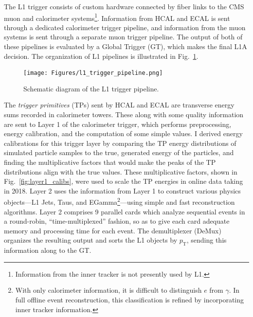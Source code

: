 The L1 trigger consists of custom hardware connected by fiber links to the CMS muon and calorimeter systems\footnote{Information
from the inner tracker is not presently used by L1.}. Information from HCAL and ECAL is
sent through a dedicated calorimeter trigger pipeline, and information from the muon systems is sent through a separate muon trigger pipeline.
The output of both of these pipelines is evaluated by a Global Trigger (GT), which makes
the final L1A decision. The organization of L1 pipelines is illustrated in Fig.~\ref{fig:l1_trigger_pipeline}.

\begin{figure}[hbtp]
  \begin{center}
    \texttt{[image: Figures/l1\_trigger\_pipeline.png]}
    \caption{
    Schematic diagram of the L1 trigger pipeline.
    }
    \label{fig:l1_trigger_pipeline}
  \end{center}
\end{figure}

The \textit{trigger primitives} (TPs) sent by HCAL and ECAL are transverse energy sums recorded in calorimeter towers.
These along with some quality information are sent to Layer 1 of the calorimeter trigger,
which performs preprocessing, energy calibration, and the computation of some simple values. I derived energy calibrations for this trigger layer
by comparing the TP energy distributions of simulated particle samples to the true, generated energy of the particles, and finding the
multiplicative factors that would make the peaks of the TP distributions align with the true values. These multiplicative factors, shown in Fig.~\ref{fig:layer1_calibs},
were used to scale the TP energies in online data taking in 2018. Layer 2 uses the information from Layer 1 to construct
various physics objects---L1 Jets, Taus, and EGamma\footnote{With only calorimeter information, it is difficult to distinguish $e$ from $\gamma$.
In full offline event reconstruction, this classification is refined by incorporating inner tracker information.}---using simple and fast reconstruction algorithms.
Layer 2 comprises 9 parallel cards which analyze sequential events in a round-robin, ``time-multiplexed'' fashion, so as to give
each card adequate memory and processing time for each event. The demultiplexer (DeMux) organizes the resulting output and sorts the L1 objects by $p_\mathrm{T}$,
sending this information along to the GT.

